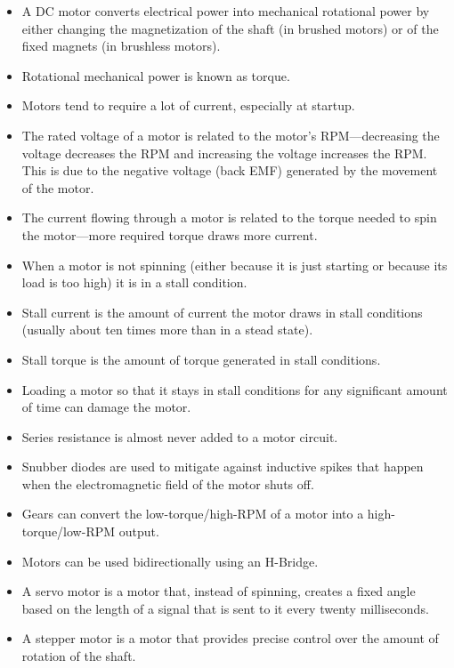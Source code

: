 \begin{itemize}
\item A DC motor converts electrical power into mechanical rotational power by either changing the magnetization of the shaft (in brushed motors) or of the fixed magnets (in brushless motors).
\item Rotational mechanical power is known as torque.
\item Motors tend to require a lot of current, especially at startup.
\item The rated voltage of a motor is related to the motor's RPM---decreasing the voltage decreases the RPM and increasing the voltage increases the RPM.  This is due to the negative voltage (back EMF) generated by the movement of the motor.
\item The current flowing through a motor is related to the torque needed to spin the motor---more required torque draws more current.
\item When a motor is not spinning (either because it is just starting or because its load is too high) it is in a stall condition.
\item Stall current is the amount of current the motor draws in stall conditions (usually about ten times more than in a stead state).
\item Stall torque is the amount of torque generated in stall conditions.
\item Loading a motor so that it stays in stall conditions for any significant amount of time can damage the motor.
\item Series resistance is almost never added to a motor circuit.
\item Snubber diodes are used to mitigate against inductive spikes that happen when the electromagnetic field of the motor shuts off.
\item Gears can convert the low-torque/high-RPM of a motor into a high-torque/low-RPM output.
\item Motors can be used bidirectionally using an H-Bridge.
\item A servo motor is a motor that, instead of spinning, creates a fixed angle based on the length of a signal that is sent to it every twenty milliseconds.
\item A stepper motor is a motor that provides precise control over the amount of rotation of the shaft.
\end{itemize}

\applysection

